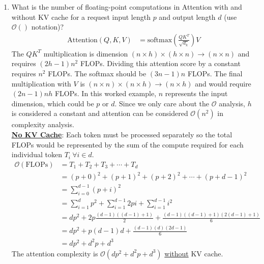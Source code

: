 \documentclass[12pt]{article}
\begin{document}
\begin{enumerate}[label=\textbf{Q\arabic*.}]
\begin{enumerate}
        \item What is the number of floating-point computations in Attention with and without KV cache for a request input length $p$ and output length $d$ (use $\mathcal{O}\left(\right)$ notation)?
        \begin{align*}
            \text{Attention}\left(Q,K,V\right) &= \text{softmax}\left(\frac{QK^T}{\sqrt{d_k}}\right)V
        \end{align*}
        The $QK^T$ multiplication is dimension $\left(n\times h\right) \times \left(h \times n\right) \rightarrow \left(n\times n\right)$ and requires $\left(2h-1\right)n^2$ FLOPs. Dividing this attention score by a constant requires $n^2$ FLOPs. The softmax should be $\left(3n-1\right)n$ FLOPs. The final multiplication with $V$ is $\left(n\times n\right) \times \left(n\times h \right) \rightarrow \left(n\times h\right)$ and would require $\left(2n-1\right)nh$ FLOPs. In this worked example, $n$ represents the input dimension, which could be $p$ or $d$. Since we only care about the $\mathcal{O}$ analysis, $h$ is considered a constant and attention can be considered $\mathcal{O}\left(n^2\right)$ in complexity analysis. \\

        \textbf{\underline{No KV Cache}}: Each token must be processed separately so the total FLOPs would be represented by the sum of the compute required for each individual token $T_i\ \forall i \in d$.
        \begin{align*}
            \mathcal{O}\left(\text{FLOPs}\right) &= T_1 + T_2 + T_3 + \cdots + T_d \\
            &= \left(p+0\right)^2 + \left(p+1\right)^2 + \left(p+2\right)^2 + \cdots + \left(p+d-1\right)^2 \\
            &= \sum_{i=0}^{d-1} \left(p+i\right)^2 \\
            &= \sum_{i=1}^{d} p^2 + \sum_{i=1}^{d-1} 2pi + \sum_{i=1}^{d-1} i^2 \\
            &= dp^2 + 2p\frac{\left(d-1\right)\left(\left(d-1\right)+1\right)}{2} + \frac{\left(d-1\right)\left(\left(d-1\right)+1\right)\left(2\left(d-1\right)+1\right)}{6} \\
            &= dp^2 + p\left(d-1\right)d + \frac{\left(d-1\right)\left(d\right)\left(2d-1\right)}{6} \\
            &= dp^2 + d^2p + d^3
        \end{align*}
        The attention complexity is $\boxed{\mathcal{O}\left(dp^2 + d^2p + d^3\right)}$ \underline{without} KV cache.\\ 


\end{enumerate}
\end{enumerate}
\end{document}

